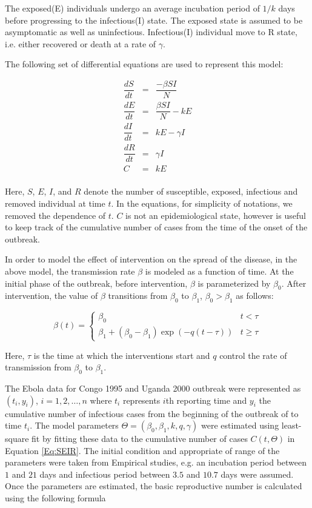 \documentclass[12pt, journal,onecolumn]{IEEEtran}
\begin{document}
The exposed(E) individuals undergo an average incubation period of $1/k$ days before progressing to the infectious(I) state. The exposed state is assumed to be asymptomatic as well as uninfectious. Infectious(I) individual move to R state, i.e. either recovered or death at a rate of $\gamma$.

The following set of differential equations are used to represent this model:

\begin{eqnarray}
\label{Eq:SEIR}
\dfrac{dS}{dt}	&=&	\dfrac{-\beta SI}{N}\nonumber\\
\dfrac{dE}{dt}	&=&	\dfrac{\beta SI}{N}-kE\nonumber\\
\dfrac{dI}{dt}	&=&	kE-\gamma I\nonumber\\
\dfrac{dR}{dt}	&=&	\gamma I\nonumber\\
C	&=&	kE\nonumber\\
 \end{eqnarray}
 
 Here, $S$, $E$, $I$, and $R$ denote the number of susceptible, exposed, infectious and removed individual at time $t$. In the equations, for simplicity of notations, we removed the dependence of $t$. $C$ is not an epidemiological state, however is useful to keep track of the cumulative number of cases from the time of the onset of the outbreak.
 
 In order to model the effect of intervention on the spread of the disease, in the above model, the transmission rate $\beta$ is modeled as a function of time. At the initial phase of the outbreak, before intervention, $\beta$ is parameterized by $\beta_0$. After intervention, the value of $\beta$ transitions from $\beta_0$ to $\beta_1$, $\beta_0>\beta_1$ as follows:
 
 \[
\beta(t)=\begin{cases}
\beta_{0} & t<\tau\\
\beta_{1}+(\beta_{0}-\beta_{1})\exp\left(-q\left(t-\tau\right)\right) & t\ge\tau
\end{cases}
\]

Here, $\tau$ is the time at which the interventions start and $q$ control the rate of transmission from $\beta_0$ to $\beta_1$.

The Ebola data for Congo 1995 and Uganda 2000 outbreak were represented as $(t_i,y_i)$, $i=1,2,\ldots,n$ where $t_i$ represents $i$th reporting time and $y_i$ the cumulative number of infectious cases from the beginning of the outbreak of to time $t_i$.  The model parameters $\Theta=(\beta_0,\beta_1,k,q,\gamma)$ were estimated using least-square fit by fitting these data to the cumulative number of cases $C(t,\Theta)$ in Equation \ref{Eq:SEIR}. The initial condition and appropriate of range of the parameters were taken from Empirical studies, e.g. an incubation period between $1$ and $21$ days and infectious period between $3.5$ and $10.7$ days were assumed. Once the parameters are estimated, the basic reproductive number is calculated using the following formula
\end{document}
